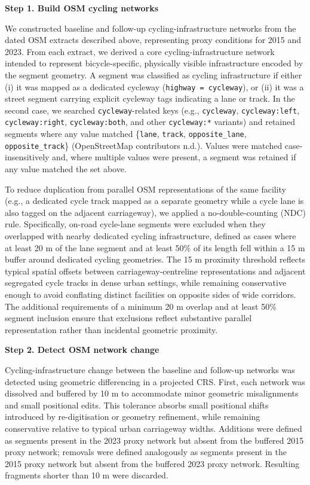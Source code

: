 \documentclass[
]{article}
\begin{document}
\textbf{Step 1. Build OSM cycling networks}

We constructed baseline and follow-up cycling-infrastructure networks
from the dated OSM extracts described above, representing proxy
conditions for 2015 and 2023. From each extract, we derived a core
cycling-infrastructure network intended to represent bicycle-specific,
physically visible infrastructure encoded by the segment geometry. A
segment was classified as cycling infrastructure if either (i) it was
mapped as a dedicated cycleway (\texttt{highway\ =\ cycleway}), or (ii)
it was a street segment carrying explicit cycleway tags indicating a
lane or track. In the second case, we searched \texttt{cycleway}-related
keys (e.g., \texttt{cycleway}, \texttt{cycleway:left},
\texttt{cycleway:right}, \texttt{cycleway:both}, and other
\texttt{cycleway:*} variants) and retained segments where any value
matched \{\texttt{lane}, \texttt{track}, \texttt{opposite\_lane},
\texttt{opposite\_track}\} (OpenStreetMap contributors n.d.). Values
were matched case-insensitively and, where multiple values were present,
a segment was retained if any value matched the set above.

To reduce duplication from parallel OSM representations of the same
facility (e.g., a dedicated cycle track mapped as a separate geometry
while a cycle lane is also tagged on the adjacent carriageway), we
applied a no-double-counting (NDC) rule. Specifically, on-road
cycle-lane segments were excluded when they overlapped with nearby
dedicated cycling infrastructure, defined as cases where at least 20 m
of the lane segment and at least 50\% of its length fell within a 15 m
buffer around dedicated cycling geometries. The 15 m proximity threshold
reflects typical spatial offsets between carriageway-centreline
representations and adjacent segregated cycle tracks in dense urban
settings, while remaining conservative enough to avoid conflating
distinct facilities on opposite sides of wide corridors. The additional
requirements of a minimum 20 m overlap and at least 50\% segment
inclusion ensure that exclusions reflect substantive parallel
representation rather than incidental geometric proximity.

\textbf{Step 2. Detect OSM network change}

Cycling-infrastructure change between the baseline and follow-up
networks was detected using geometric differencing in a projected CRS.
First, each network was dissolved and buffered by 10 m to accommodate
minor geometric misalignments and small positional edits. This tolerance
absorbs small positional shifts introduced by re-digitisation or
geometry refinement, while remaining conservative relative to typical
urban carriageway widths. Additions were defined as segments present in
the 2023 proxy network but absent from the buffered 2015 proxy network;
removals were defined analogously as segments present in the 2015 proxy
network but absent from the buffered 2023 proxy network. Resulting
fragments shorter than 10 m were discarded.
\end{document}
